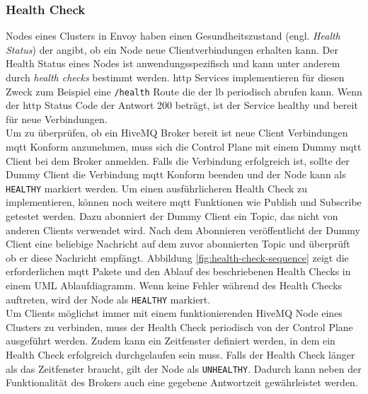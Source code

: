 \subsubsection{Health Check} \label{ss:health-check}
Nodes eines Clusters in Envoy haben einen Gesundheitszustand (engl. \textit{Health Status}) der angibt, ob ein Node neue Clientverbindungen erhalten kann.
Der Health Status eines Nodes ist anwendungsspezifisch und kann unter anderem durch \textit{health checks} bestimmt werden.
\ac{http} Services implementieren für diesen Zweck zum Beispiel eine \verb|/health| Route die der \acl{lb} periodisch abrufen kann. Wenn der \ac{http} Status Code der Antwort 200 beträgt, ist der Service healthy und bereit für neue Verbindungen.
\\
Um zu überprüfen, ob ein HiveMQ Broker bereit ist neue Client Verbindungen \ac{mqtt} Konform anzunehmen, muss sich die Control Plane mit einem Dummy \ac{mqtt} Client bei dem Broker anmelden. Falls die Verbindung erfolgreich ist, sollte der Dummy Client die Verbindung \ac{mqtt} Konform beenden und der Node kann als \verb|HEALTHY| markiert werden.
Um einen ausführlicheren Health Check zu implementieren, können noch weitere \ac{mqtt} Funktionen wie Publish und Subscribe getestet werden. Dazu abonniert der Dummy Client ein Topic, das nicht von anderen Clients verwendet wird. Nach dem Abonnieren veröffentlicht der Dummy Client eine beliebige Nachricht auf dem zuvor abonnierten Topic und überprüft ob er diese Nachricht empfängt. Abbildung \ref{fig:health-check-sequence} zeigt die erforderlichen \ac{mqtt} Pakete und den Ablauf des beschriebenen Health Checks in einem UML Ablaufdiagramm. Wenn keine Fehler während des Health Checks auftreten, wird der Node als \verb|HEALTHY| markiert.
\\
Um Clients möglichst immer mit einem funktionierenden HiveMQ Node eines Clusters zu verbinden, muss der Health Check periodisch von der Control Plane ausgeführt werden.
Zudem kann ein Zeitfenster definiert werden, in dem ein Health Check erfolgreich durchgelaufen sein muss. Falls der Health Check länger als das Zeitfenster braucht, gilt der Node als \verb|UNHEALTHY|. Dadurch kann neben der Funktionalität des Brokers auch eine gegebene Antwortzeit gewährleistet werden.
